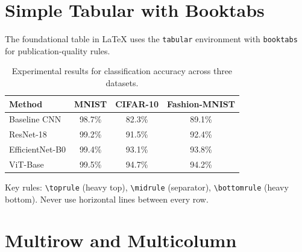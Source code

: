 \documentclass[
    language=english,
    doctype=article,
    institution=none,
]{../../omnilatex}
\begin{document}
\maketitle

\begin{abstract}
This gallery showcases 20 distinct table types commonly used in scientific
publications, financial reports, and technical documentation. Each example
is self-contained with annotations explaining key techniques and best practices.
\end{abstract}

\tableofcontents

\section{Simple Tabular with Booktabs}
\label{sec:simple-tabular}

The foundational table in LaTeX uses the \texttt{tabular} environment with
\texttt{booktabs} for publication-quality rules.

\begin{table}[htbp]
    \centering
    \caption{Experimental results for classification accuracy across three datasets.}
    \label{tab:simple}
    \begin{tabular}{lccc}
        \toprule
        Method          & MNIST    & CIFAR-10 & Fashion-MNIST \\
        \midrule
        Baseline CNN    & 98.7\%   & 82.3\%   & 89.1\%        \\
        ResNet-18       & 99.2\%   & 91.5\%   & 92.4\%        \\
        EfficientNet-B0 & 99.4\%   & 93.1\%   & 93.8\%        \\
        ViT-Base        & 99.5\%   & 94.7\%   & 94.2\%        \\
        \bottomrule
    \end{tabular}
\end{table}

\noindent Key rules: \verb|\toprule| (heavy top), \verb|\midrule| (separator),
\verb|\bottomrule| (heavy bottom). Never use horizontal lines between every row.

\section{Multirow and Multicolumn}
\label{sec:multirow-multicolumn}
\end{document}
